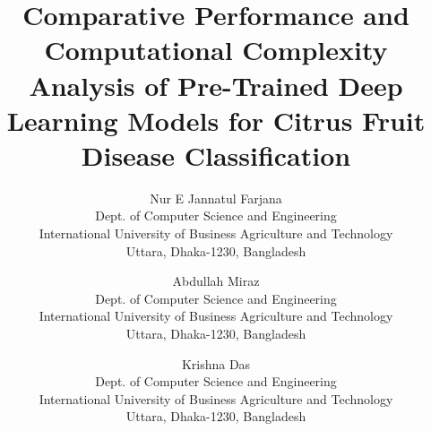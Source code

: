 \documentclass{ijcaArticle}
\begin{document}
\title{Comparative Performance and Computational Complexity Analysis of Pre-Trained Deep Learning Models for Citrus Fruit Disease Classification}

\author{ 
   \large Nur E Jannatul Farjana \\[-3pt]
   \normalsize Dept. of Computer Science and Engineering \\[-3pt]
   \normalsize International University of Business Agriculture and Technology \\[-3pt]
   \normalsize Uttara, Dhaka-1230, Bangladesh \\[-3pt]
  \and
   \large Abdullah Miraz \\[-3pt]
   \normalsize Dept. of Computer Science and Engineering \\[-3pt]
   \normalsize International University of Business Agriculture and Technology \\[-3pt]
   \normalsize Uttara, Dhaka-1230, Bangladesh \\[-3pt]
  \and
   \large Krishna Das \\[-3pt]
   \normalsize Dept. of Computer Science and Engineering \\[-3pt]
   \normalsize International University of Business Agriculture and Technology \\[-3pt]
   \normalsize Uttara, Dhaka-1230, Bangladesh \\[-3pt]
}


\maketitle
\end{document}
